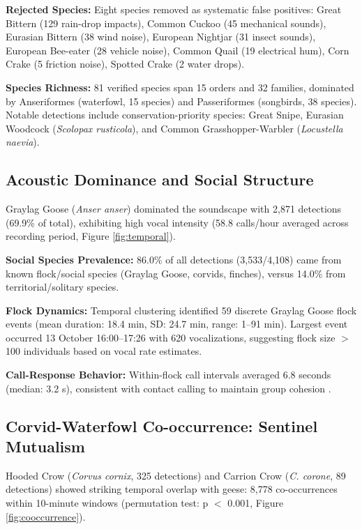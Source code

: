 \documentclass[twocolumn]{article}
\begin{document}
\textbf{Rejected Species:} Eight species removed as systematic false positives: Great Bittern (129 rain-drop impacts), Common Cuckoo (45 mechanical sounds), Eurasian Bittern (38 wind noise), European Nightjar (31 insect sounds), European Bee-eater (28 vehicle noise), Common Quail (19 electrical hum), Corn Crake (5 friction noise), Spotted Crake (2 water drops).

\textbf{Species Richness:} 81 verified species span 15 orders and 32 families, dominated by Anseriformes (waterfowl, 15 species) and Passeriformes (songbirds, 38 species). Notable detections include conservation-priority species: Great Snipe, Eurasian Woodcock (\textit{Scolopax rusticola}), and Common Grasshopper-Warbler (\textit{Locustella naevia}).

\subsection{Acoustic Dominance and Social Structure}

Graylag Goose (\textit{Anser anser}) dominated the soundscape with 2,871 detections (69.9\% of total), exhibiting high vocal intensity (58.8 calls/hour averaged across recording period, Figure \ref{fig:temporal}).

\textbf{Social Species Prevalence:} 86.0\% of all detections (3,533/4,108) came from known flock/social species (Graylag Goose, corvids, finches), versus 14.0\% from territorial/solitary species.

\textbf{Flock Dynamics:} Temporal clustering identified 59 discrete Graylag Goose flock events (mean duration: 18.4 min, SD: 24.7 min, range: 1--91 min). Largest event occurred 13 October 16:00--17:26 with 620 vocalizations, suggesting flock size $>$100 individuals based on vocal rate estimates.

\textbf{Call-Response Behavior:} Within-flock call intervals averaged 6.8 seconds (median: 3.2 s), consistent with contact calling to maintain group cohesion \citep{Black2019}.

\subsection{Corvid-Waterfowl Co-occurrence: Sentinel Mutualism}

Hooded Crow (\textit{Corvus cornix}, 325 detections) and Carrion Crow (\textit{C. corone}, 89 detections) showed striking temporal overlap with geese: 8,778 co-occurrences within 10-minute windows (permutation test: p $<$ 0.001, Figure \ref{fig:cooccurrence}).
\end{document}
